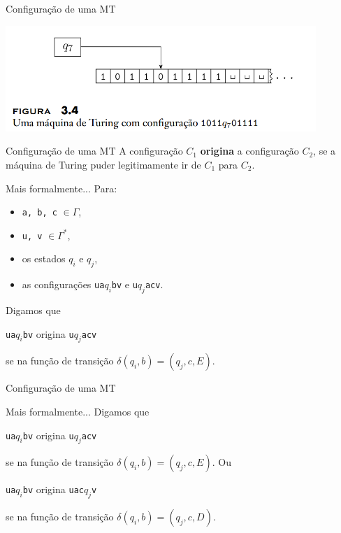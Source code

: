\documentclass[xcolor=dvipsnames,table]{beamer}
\begin{document}
	\begin{frame}{Configuração de uma MT}
		\begin{center}
			\includegraphics[height=4cm]{images/fig34.png}
		\end{center}
	\end{frame}
	
	\begin{frame}{Configuração de uma MT}
		A configuração $C_1$ {\bf origina} a configuração $C_2$, se a máquina de Turing puder legitimamente ir de $C_1$ para $C_2$.
		\begin{block}{Mais formalmente...}					Para:
			\begin{itemize}
				\item {\tt a, b, c} $\in \Gamma$,
				\item {\tt u, v} $\in \Gamma^*$, 
				\item os estados $q_i$ e $q_j$, 
				\item as configurações {\tt ua}$q_i${\tt bv} e {\tt u}$q_j${\tt acv}.
				\end{itemize}
			\pause	
			Digamos que 
			\begin{center}
				{\tt ua}$q_i${\tt bv} origina {\tt u}$q_j${\tt acv} 
			\end{center} 
			se na função de transição $\delta(q_i, b) = (q_j, c, E)$.
		\end{block}
	\end{frame}
	
	\begin{frame}{Configuração de uma MT}
		\begin{block}{Mais formalmente...}
			Digamos que 
			\begin{center}
				{\tt ua}$q_i${\tt bv} origina {\tt u}$q_j${\tt acv} 
			\end{center} 
			se na função de transição $\delta(q_i, b) = (q_j, c, E)$. Ou
			\begin{center}
				{\tt ua}$q_i${\tt bv} origina {\tt uac}$q_j${\tt v} 
			\end{center} 
			se na função de transição $\delta(q_i, b) = (q_j, c, D)$.
		\end{block}
	\end{frame}
	
\end{document}
